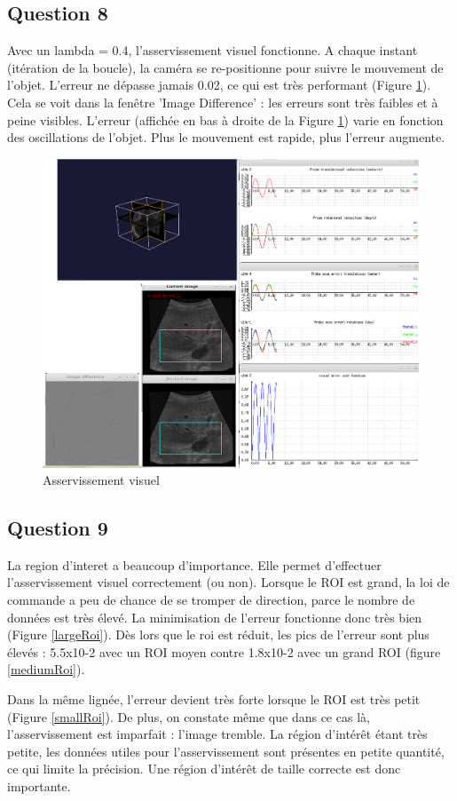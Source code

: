 \documentclass[a4paper,11pt]{article}
\begin{document}
\subsection{Question 8}
Avec un lambda = 0.4, l'asservissement visuel fonctionne. A chaque instant (it\'eration de la boucle), la cam\'era se re-positionne pour suivre le mouvement de l'objet. L'erreur ne d\'epasse jamais 0.02, ce qui est tr\`es performant (Figure \ref{assertVisu}). Cela se voit dans la fen\^etre 'Image Difference' : les erreurs sont tr\`es faibles et \`a peine visibles. L'erreur (affich\'ee en bas \`a droite de la Figure \ref{assertVisu}) varie en fonction des oscillations de l'objet. Plus le mouvement est rapide, plus l'erreur augmente.
\begin{figure}[H]
    \centering
    \includegraphics[width=1.0\textwidth]{./images/q8.png}
    \caption{Asservissement visuel}
    \label{assertVisu}
\end{figure}


\subsection{Question 9}
La region d'interet a beaucoup d'importance. Elle permet d'effectuer l'asservissement visuel correctement (ou non). Lorsque le ROI est grand, la loi de commande a peu de chance de se tromper de direction, parce le nombre de donn\'ees est tr\`es \'elev\'e. La minimisation de l'erreur fonctionne donc tr\`es bien (Figure \ref{largeRoi}). D\`es lors que le roi est r\'eduit, les pics de l'erreur sont plus \'elev\'es : 5.5x10-2 avec un ROI moyen contre 1.8x10-2 avec un grand ROI (figure \ref{mediumRoi}).
\par
Dans la m\^eme lign\'ee, l'erreur devient tr\`es forte lorsque le ROI est tr\`es petit (Figure \ref{smallRoi}). De plus, on constate m\^eme que dans ce cas l\`a, l'asservissement est imparfait : l'image tremble. La r\'egion d'int\'er\^et \'etant tr\`es petite, les donn\'ees utiles pour l'asservissement sont pr\'esentes en petite quantit\'e, ce qui limite la pr\'ecision. Une r\'egion d'int\'er\^et de taille correcte est donc importante.
\end{document}
